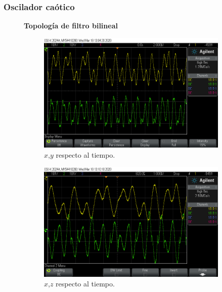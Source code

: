 \documentclass[10pt]{beamer}
\begin{document}
	\begin{frame}
		\frametitle{Oscilador caótico}
		\begin{figure}[!ht]
		\textbf{Topología de filtro bilineal}
	\caption{Respuesta en el dominio temporal de oscilador caótico con $\alpha = 0.8$ y dos enrollamientos.}
	\label{fig:temporal_imp}
	  \begin{subfigure}[b]{0.3\textwidth}
	    \includegraphics[trim={6cm 2cm 9cm 2cm},clip,width=\textwidth]{../imagenes/Y3_X_vs_Y_signal.png}
	    \caption{$x$,$y$ respecto al tiempo.}
	    \label{fig:Y3_X_vs_Y_signal}
	  \end{subfigure}
	  \hfill
	  \begin{subfigure}[b]{0.3\textwidth}
	    \includegraphics[trim={6cm 2cm 9cm 2cm},clip,width=\textwidth]{../imagenes/Y5_X_vs_Z_signal.png}
	    \caption{$x$,$z$ respecto al tiempo.}
	    \label{fig:Y5_X_vs_Z_signal}
	  \end{subfigure}
	  \hfill
	  \begin{subfigure}[b]{0.3\textwidth}

\end{subfigure}
\end{figure}
\end{frame}
\end{document}
